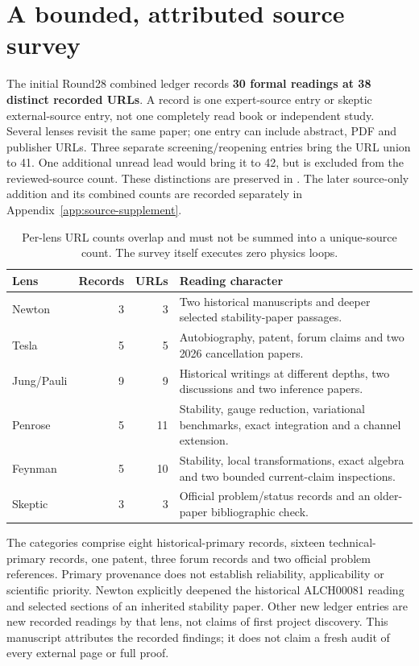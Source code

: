 \section{A bounded, attributed source survey}
The initial Round28 combined ledger records \textbf{30 formal readings at 38 distinct recorded URLs}. A record is one expert-source entry or skeptic external-source entry, not one completely read book or independent study. Several lenses revisit the same paper; one entry can include abstract, PDF and publisher URLs. Three separate screening/reopening entries bring the URL union to 41. One additional unread lead would bring it to 42, but is excluded from the reviewed-source count. These distinctions are preserved in . The later source-only addition and its combined counts are recorded separately in Appendix~\ref{app:source-supplement}.

\begin{table}[ht]\centering\small
\begin{tabularx}{\textwidth}{@{}p{23mm}rrX@{}}
\toprule Lens & Records & URLs & Reading character \\
\midrule
Newton & 3 & 3 & Two historical manuscripts and deeper selected stability-paper passages.\\
Tesla & 5 & 5 & Autobiography, patent, forum claims and two 2026 cancellation papers.\\
Jung/Pauli & 9 & 9 & Historical writings at different depths, two discussions and two inference papers.\\
Penrose & 5 & 11 & Stability, gauge reduction, variational benchmarks, exact integration and a channel extension.\\
Feynman & 5 & 10 & Stability, local transformations, exact algebra and two bounded current-claim inspections.\\
Skeptic & 3 & 3 & Official problem/status records and an older-paper bibliographic check.\\
\bottomrule
\end{tabularx}
\caption{Per-lens URL counts overlap and must not be summed into a unique-source count. The survey itself executes zero physics loops.}
\end{table}

The categories comprise eight historical-primary records, sixteen technical-primary records, one patent, three forum records and two official problem references. Primary provenance does not establish reliability, applicability or scientific priority. Newton explicitly deepened the historical ALCH00081 reading and selected sections of an inherited stability paper. Other new ledger entries are new recorded readings by that lens, not claims of first project discovery. This manuscript attributes the recorded findings; it does not claim a fresh audit of every external page or full proof.

